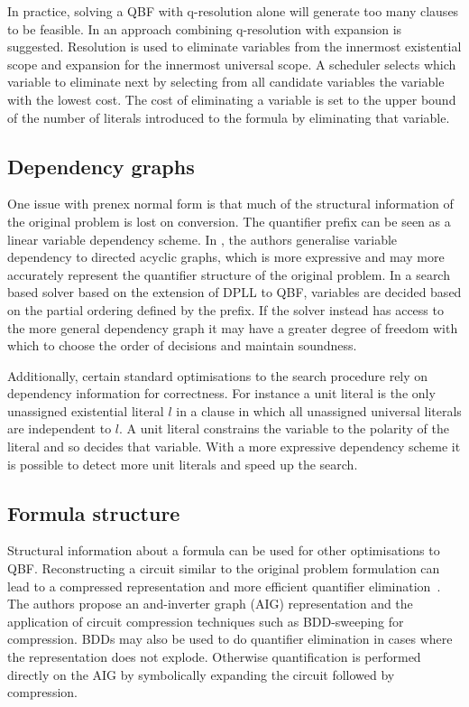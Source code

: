 In practice, solving a QBF with q-resolution alone will generate too many clauses to be feasible. In \cite{Biere05} an approach combining q-resolution with expansion is suggested. Resolution is used to eliminate variables from the innermost existential scope and expansion for the innermost universal scope. A scheduler selects which variable to eliminate next by selecting from all candidate variables the variable with the lowest cost. The cost of eliminating a variable is set to the upper bound of the number of literals introduced to the formula by eliminating that variable.

\subsection{Dependency graphs}

One issue with prenex normal form is that much of the structural information of the original problem is lost on conversion. The quantifier prefix can be seen as a linear variable dependency scheme. In \cite{Lonsing10}, the authors generalise variable dependency to directed acyclic graphs, which is more expressive and may more accurately represent the quantifier structure of the original problem. In a search based solver based on the extension of DPLL to QBF, variables are decided based on the partial ordering defined by the prefix. If the solver instead has access to the more general dependency graph it may have a greater degree of freedom with which to choose the order of decisions and maintain soundness.

Additionally, certain standard optimisations to the search procedure rely on dependency information for correctness. For instance a unit literal is the only unassigned existential literal $l$ in a clause in which all unassigned universal literals are independent to $l$. A unit literal constrains the variable to the polarity of the literal and so decides that variable. With a more expressive dependency scheme it is possible to detect more unit literals and speed up the search.

\subsection{Formula structure}

Structural information about a formula can be used for other optimisations to QBF. Reconstructing a circuit similar to the original problem formulation can lead to a compressed representation and more efficient quantifier elimination~\cite{Pigorsch10, Pigorsch09}. The authors propose an and-inverter graph (AIG) representation and the application of circuit compression techniques such as BDD-sweeping for compression. BDDs may also be used to do quantifier elimination in cases where the representation does not explode. Otherwise quantification is performed directly on the AIG by symbolically expanding the circuit followed by compression.

